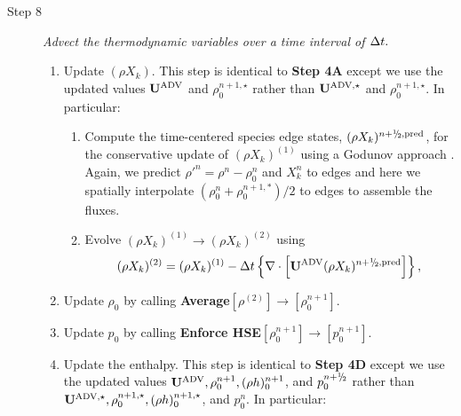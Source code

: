 \begin{description}
\item[Step 8] {\em Advect the thermodynamic variables over a time interval of $\Delta t.$}

\begin{enumerate}
\renewcommand{\theenumi}{{\bf \Alph{enumi}}}

\item Update $(\rho X_k)$.  This step is identical to {\bf Step 4A} except we use
  the updated values ${\bf{U}}^{\mathrm{ADV}}$ and $\rho_0^{n+1,\star}$ rather than
  ${\bf{U}}^{\mathrm{ADV},\star}$ and $\rho_0^{n+1,\star}$.  In particular:

\begin{enumerate}
\renewcommand{\labelenumii}{{\bf \roman{enumii}}.}

\item Compute the time-centered species edge states, $(\rho X_k)^{\nph,\pred}$,
  for the conservative update of $(\rho X_k)^{(1)}$ using a Godunov approach \citep{XRB_III}.
  Again, we predict $\rho'^n=\rho^n-\rho_0^n$ and $X_k^n$ to edges
  and here we spatially interpolate $(\rho_0^n+\rho_0^{n+1,*})/2$ to edges to assemble the fluxes.


\item Evolve $(\rho X_k)^{(1)} \rightarrow (\rho X_k)^{(2)}$ using
\begin{equation}
(\rho X_k)^{(2)} = (\rho X_k)^{(1)}
- \dt \left\{ \nabla \cdot \left[\uadvtwo (\rho X_k)^{\nph,\pred} \right] \right\},
\end{equation}

\end{enumerate}

\item Update $\rho_0$ by calling {\bf Average}$[\rho^{(2)}]\rightarrow[\rho_0^{n+1}]$.

\item Update $p_0$ by calling {\bf Enforce HSE}$[\rho_0^{n+1}] \rightarrow [p_0^{n+1}]$.

\item Update the enthalpy.  This step is identical to {\bf Step 4D} except we use
  the updated values ${\bf{U}}^{\mathrm{ADV}}, \rho_0^{n+1}, (\rho h)_0^{n+1}$, and $p_0^{\nph}$
  rather than
  ${\bf{U}}^{\mathrm{ADV},\star}, \rho_0^{n+1,\star}, (\rho h)_0^{n+1,\star}$, and $p_0^n$.
  In particular:

\begin{enumerate}
\renewcommand{\labelenumii}{{\bf \roman{enumii}}.}


\end{enumerate}
\end{enumerate}
\end{description}
